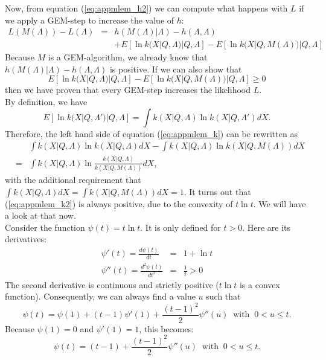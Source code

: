 Now, from equation (\ref{eq:appmlem_h2}) we can compute what happens with $L$
if we apply a GEM-step to increase the value of $h$:
\begin{align}
  L(M(\Lambda)) - L(\Lambda) & = &
  h(M(\Lambda) | \Lambda) - h(\Lambda, \Lambda) \nonumber \\
  & &  + E\left[\ln k(X | Q, \Lambda) | Q,\Lambda\right] 
       - E\left[\ln k(X | Q, M(\Lambda)) | Q,\Lambda\right] \label{eq:appmlem_l}
\end{align}
Because $M$ is a GEM-algorithm, we already know that $h(M(\Lambda) | \Lambda) -
h(\Lambda, \Lambda)$ is positive. If we can also show that
\begin{equation}
  E\left[\ln k(X | Q, \Lambda) | Q,\Lambda\right] 
   - E\left[\ln k(X | Q, M(\Lambda)) | Q,\Lambda\right] \geq 0 \label{eq:appmlem_k}
\end{equation}
then we have proven that every GEM-step increases the likelihood $L$.\\[3mm]

By definition, we have
\begin{equation}
  E\left[\ln k(X | Q, \Lambda') | Q,\Lambda\right] =
     \int k(X | Q, \Lambda) \ln k(X | Q, \Lambda') dX.
\end{equation}
Therefore, the left hand side of equation (\ref{eq:appmlem_k}) can be
rewritten as
\begin{align}
& &  \int k(X | Q, \Lambda) \ln k(X | Q, \Lambda) dX 
  - \int k(X | Q, \Lambda) \ln k(X | Q, M(\Lambda)) dX \\
& = & \int k(X | Q, \Lambda)
        \ln \frac{k(X | Q, \Lambda)}{k(X | Q, M(\Lambda))} dX, 
        \label{eq:appmlem_k2}
\end{align}
with the additional requirement that $\int k(X | Q, \Lambda) dX = \int k(X |
Q, M(\Lambda)) dX = 1$. It turns out that (\ref{eq:appmlem_k2}) is always
positive, due to the convexity of $t \ln t$. We will have a look at that
now.\\[3mm]

Consider the function $\psi(t) = t \ln t$. It is only defined for $t >
0$. Here are its derivatives:
\begin{align}
  \psi'(t) = \frac{d \psi(t)}{dt} & = & 1 + \ln t\\
  \psi''(t) = \frac{d^2 \psi(t)}{dt^2} & = & \frac{1}{t} > 0
\end{align}
The second derivative is continuous and strictly positive ($t \ln t$ is a
convex function). Consequently, we can always find a value $u$ such that
\begin{equation}
  \psi(t) = \psi(1) + (t - 1) \psi'(1) + \frac{(t-1)^2}{2} \psi''(u) 
       \;\; \mbox{with} \;\; 0 < u \leq t.
\end{equation}
Because $\psi(1) = 0$ and $\psi'(1) = 1$, this becomes:
\begin{equation}
  \psi(t) = (t - 1) + \frac{(t-1)^2}{2} \psi''(u) 
       \;\; \mbox{with} \;\; 0 < u \leq t.
\end{equation}

